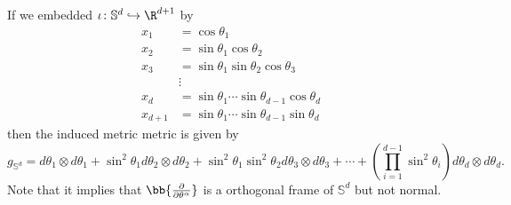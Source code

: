 \begin{enumerate}[label=\arabic{*}.]
    \begin{rmk}
        If we embedded $\iota \colon \mathbb{S}^d \hookrightarrow \R^{d+1}$ by
        \begin{align*}
            x_1 & =\cos \theta_1 \\
            x_2 & =\sin \theta_1 \cos \theta_2 \\
            x_3 & =\sin \theta_1 \sin \theta_2 \cos \theta_3 \\
            & \vdots \\
            x_d & =\sin \theta_1 \cdots \sin \theta_{d-1} \cos \theta_d \\
            x_{d+1} & =\sin \theta_1 \cdots \sin \theta_{d-1} \sin \theta_d
        \end{align*}
        then the induced metric metric is given by
        \begin{equation*}
            g_{\mathbb{S}^d}=d \theta_1\otimes d\theta_1 +\sin ^2 \theta_1 d \theta_2\otimes d\theta_2+\sin ^2 \theta_1 \sin ^2 \theta_2 d \theta_3\otimes d\theta_3+\cdots+\left(\prod_{i=1}^{d-1} \sin ^2 \theta_i\right) d \theta_d\otimes d\theta_d.
        \end{equation*}
        Note that it implies that $\bb{\frac{\partial}{\partial \theta^\alpha}}$ is a orthogonal frame of $\mathbb{S}^d$ but not normal.
    \end{rmk}
\end{enumerate}

